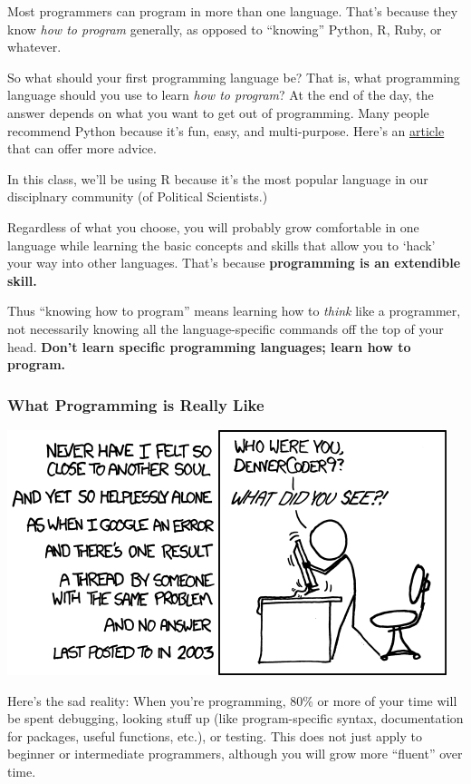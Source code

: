 \documentclass[]{book}
\begin{document}
Most programmers can program in more than one language. That's because
they know \emph{how to program} generally, as opposed to ``knowing''
Python, R, Ruby, or whatever.

So what should your first programming language be? That is, what
programming language should you use to learn \emph{how to program}? At
the end of the day, the answer depends on what you want to get out of
programming. Many people recommend Python because it's fun, easy, and
multi-purpose. Here's an
\href{http://lifehacker.com/which-programming-language-should-i-learn-first-1477153665}{article}
that can offer more advice.

In this class, we'll be using R because it's the most popular language
in our disciplnary community (of Political Scientists.)

Regardless of what you choose, you will probably grow comfortable in one
language while learning the basic concepts and skills that allow you to
`hack' your way into other languages. That's because \textbf{programming
is an extendible skill.}

Thus ``knowing how to program'' means learning how to \emph{think} like
a programmer, not necessarily knowing all the language-specific commands
off the top of your head. \textbf{Don't learn specific programming
languages; learn how to program.}

\subsubsection*{What Programming is Really
Like}\label{what-programming-is-really-like}

\begin{center}\includegraphics[width=0.7\linewidth]{img/xkcd} \end{center}

Here's the sad reality: When you're programming, 80\% or more of your
time will be spent debugging, looking stuff up (like program-specific
syntax, documentation for packages, useful functions, etc.), or testing.
This does not just apply to beginner or intermediate programmers,
although you will grow more ``fluent'' over time.
\end{document}
